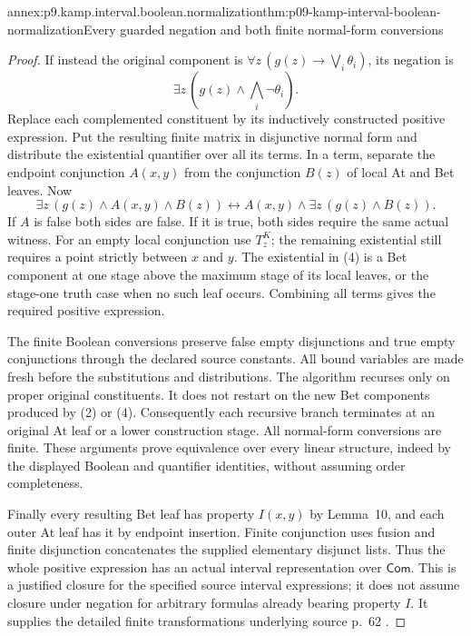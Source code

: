\begin{annexitem}{annex:p9.kamp.interval.boolean.normalization}{thm:p09-kamp-interval-boolean-normalization}{Every guarded negation and both finite normal-form conversions}
\begin{proof}
If instead the original component is
\(\forall z\,(g(z)\to\bigvee_i\theta_i)\), its negation is
\[
                  \exists z\,(g(z)\land\bigwedge_i\neg\theta_i).
 \tag{3}
\]
Replace each complemented constituent by its inductively constructed
positive expression. Put the resulting finite matrix in disjunctive
normal form and distribute the existential quantifier over all its
terms. In a term, separate the endpoint conjunction \(A(x,y)\)
from the conjunction \(B(z)\) of local At and Bet leaves.
Now
\[
 \exists z\,(g(z)\land A(x,y)\land B(z))
 \longleftrightarrow A(x,y)\land\exists z\,(g(z)\land B(z)).
 \tag{4}
\]
If \(A\) is false both sides are false. If it is true,
both sides require the same actual witness. For an empty local
conjunction use \(T^K_z\); the remaining existential still
requires a point strictly between \(x\) and \(y\).
The existential in (4) is a Bet component at one stage above
the maximum stage of its local leaves, or the stage-one truth
case when no such leaf occurs. Combining all terms gives the
required positive expression.

The finite Boolean conversions preserve false empty disjunctions and
true empty conjunctions through the declared source constants. All
bound variables are made fresh before the substitutions and distributions.
The algorithm recurses only on proper original constituents. It does
not restart on the new Bet components produced by (2) or (4).
Consequently each recursive branch terminates at an original At
leaf or a lower construction stage. All normal-form conversions
are finite. These arguments prove equivalence over every linear
structure, indeed by the displayed Boolean and quantifier identities,
without assuming order completeness.

Finally every resulting Bet leaf has property \(I(x,y)\)
by Lemma~10, and each outer At leaf has it by endpoint insertion.
Finite conjunction uses fusion and finite disjunction concatenates
the supplied elementary disjunct lists. Thus the whole positive
expression has an actual interval representation over
\(\mathsf{Com}\). This is a justified closure for the
specified source interval expressions; it does not assume closure
under negation for arbitrary formulas already bearing property \(I\).
It supplies the detailed finite transformations underlying source
p.~62 \cite[ch.~III, pp.~61--62, 93]{Kamp1968}.
\end{proof}
\end{annexitem}
